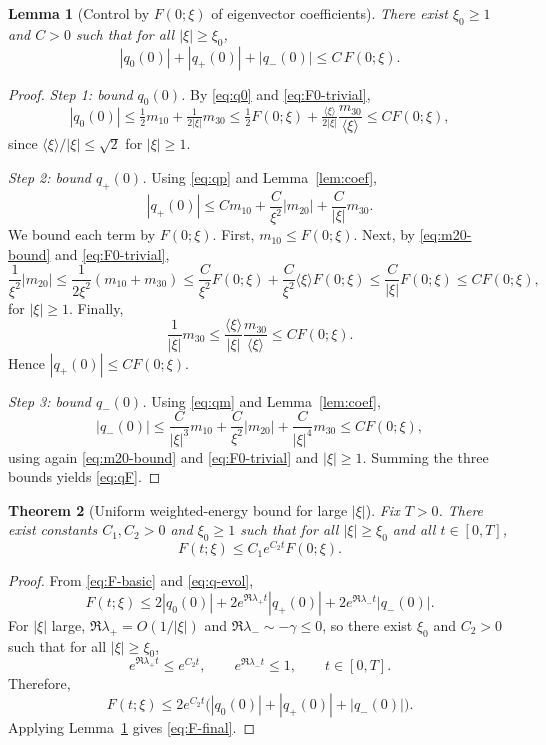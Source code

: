 \documentclass{article}
\newcommand{\ang}[1]{\langle #1\rangle}
\newtheorem{theorem}{Theorem}[section]
\newtheorem{lemma}[theorem]{Lemma}
\begin{document}
\begin{lemma}[Control by $F(0;\xi)$ of eigenvector coefficients]\label{lem:qF}
There exist $\xi_0\ge1$ and $C>0$ such that for all $|\xi|\ge\xi_0$,
\begin{equation}\label{eq:qF}
|q_0(0)|+|q_+(0)|+|q_-(0)|\le C\,F(0;\xi).
\end{equation}
\end{lemma}

\begin{proof}
\emph{Step 1: bound $q_0(0)$.}
By \eqref{eq:q0} and \eqref{eq:F0-trivial},
\[
|q_0(0)|\le \tfrac12 m_{10}+\tfrac1{2|\xi|}m_{30}
\le \tfrac12F(0;\xi)+\tfrac{\ang{\xi}}{2|\xi|}\frac{m_{30}}{\ang{\xi}}
\le C F(0;\xi),
\]
since $\ang{\xi}/|\xi|\le \sqrt{2}$ for $|\xi|\ge 1$.

\medskip
\noindent
\emph{Step 2: bound $q_+(0)$.}
Using \eqref{eq:qp} and Lemma~\ref{lem:coef},
\[
|q_+(0)|\le C m_{10}+\frac{C}{\xi^2}|m_{20}|+\frac{C}{|\xi|}m_{30}.
\]
We bound each term by $F(0;\xi)$. First, $m_{10}\le F(0;\xi)$.
Next, by \eqref{eq:m20-bound} and \eqref{eq:F0-trivial},
\[
\frac{1}{\xi^2}|m_{20}|\le \frac{1}{2\xi^2}(m_{10}+m_{30})
\le \frac{C}{\xi^2}F(0;\xi)+\frac{C}{\xi^2}\ang{\xi}F(0;\xi)
\le \frac{C}{|\xi|}F(0;\xi)\le C F(0;\xi),
\]
for $|\xi|\ge 1$.
Finally,
\[
\frac{1}{|\xi|}m_{30}\le \frac{\ang{\xi}}{|\xi|}\frac{m_{30}}{\ang{\xi}}
\le C F(0;\xi).
\]
Hence $|q_+(0)|\le C F(0;\xi)$.

\medskip
\noindent
\emph{Step 3: bound $q_-(0)$.}
Using \eqref{eq:qm} and Lemma~\ref{lem:coef},
\[
|q_-(0)|\le \frac{C}{|\xi|^3}m_{10}+\frac{C}{\xi^2}|m_{20}|+\frac{C}{|\xi|^4}m_{30}
\le C F(0;\xi),
\]
using again \eqref{eq:m20-bound} and \eqref{eq:F0-trivial} and $|\xi|\ge 1$. Summing the three bounds yields \eqref{eq:qF}.
\end{proof}

\begin{theorem}[Uniform weighted-energy bound for large $|\xi|$]\label{thm:F}
Fix $T>0$. There exist constants $C_1,C_2>0$ and $\xi_0\ge1$ such that for all $|\xi|\ge\xi_0$
and all $t\in[0,T]$,
\begin{equation}\label{eq:F-final}
F(t;\xi)\le C_1 e^{C_2 t}F(0;\xi).
\end{equation}
\end{theorem}

\begin{proof}
From \eqref{eq:F-basic} and \eqref{eq:q-evol},
\[
F(t;\xi)\le 2|q_0(0)|+2e^{\Re\lambda_+ t}|q_+(0)|+2e^{\Re\lambda_- t}|q_-(0)|.
\]
For $|\xi|$ large, $\Re\lambda_+=O(1/|\xi|)$ and $\Re\lambda_- \sim -\gamma \le 0$,
so there exist $\xi_0$ and $C_2>0$ such that for all $|\xi|\ge\xi_0$,
\[
e^{\Re\lambda_+ t}\le e^{C_2 t},\qquad e^{\Re\lambda_- t}\le 1,\qquad t\in[0,T].
\]
Therefore,
\[
F(t;\xi)\le 2e^{C_2 t}\bigl(|q_0(0)|+|q_+(0)|+|q_-(0)|\bigr).
\]
Applying Lemma~\ref{lem:qF} gives \eqref{eq:F-final}.
\end{proof}
\end{document}
